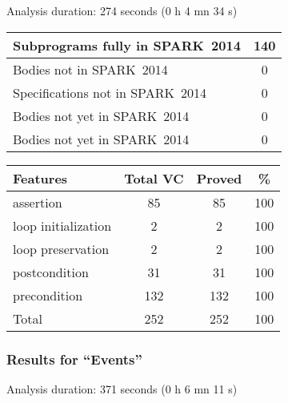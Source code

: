 \documentclass[10pt,a4paper,twocolumn]{article}
\newcommand{\newspark}{SPARK~2014\xspace}
\begin{document}
Analysis duration: 274 seconds (0 h 4 mn 34 s)

\vspace{5mm}

\begin{tabular}{|l|c|}
\hline
Subprograms fully in \newspark  & 140 \\
\hline
Bodies not in \newspark         & 0   \\
\hline
Specifications not in \newspark & 0   \\
\hline
Bodies not yet in \newspark     & 0   \\
\hline
Bodies not yet in \newspark     & 0   \\
\hline
\end{tabular}

\vspace{5mm}

\begin{tabular}{|l|c|c|c|}
\hline
Features            & Total VC & Proved & \%  \\ %
\hline
assertion           & 85       & 85     & 100 \\ %
\hline
loop initialization & 2        & 2      & 100 \\ %
\hline
loop  preservation  & 2        & 2      & 100 \\ %
\hline
postcondition       & 31       & 31     & 100 \\ %
\hline
precondition        & 132      & 132    & 100 \\ %
\hline
Total               & 252      & 252    & 100 \\ %
\hline
\end{tabular}

\subsubsection{Results for ``Events''}

Analysis duration: 371 seconds (0 h 6 mn 11 s)
\end{document}
